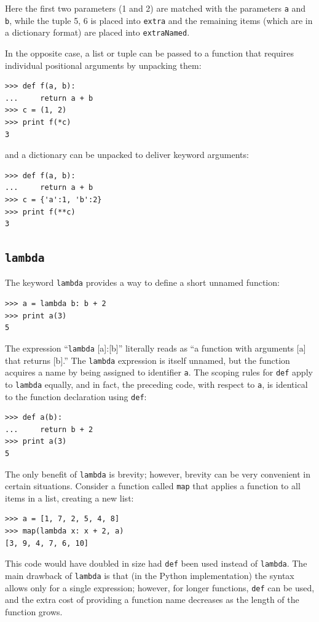 \documentclass[justified,sixbynine]{tufte-book}
\def\ft{\small\tt}
\theoremstyle{plain}%
\theoremstyle{definition}
\theoremstyle{remark}
\begin{document}
\begin{fullwidth}
Here the first two parameters (1 and 2) are matched with the parameters {\ft a} and {\ft b}, while the tuple 5, 6 is placed into {\ft extra} and the remaining items (which are in a dictionary format) are placed into {\ft extraNamed}.

In the opposite case, a list or tuple can be passed to a function that requires individual positional arguments by unpacking them:

\begin{lstlisting}
>>> def f(a, b):
...     return a + b
>>> c = (1, 2)
>>> print f(*c)
3
\end{lstlisting}
\noindent and a dictionary can be unpacked to deliver keyword arguments:

\begin{lstlisting}
>>> def f(a, b):
...     return a + b
>>> c = {'a':1, 'b':2}
>>> print f(**c)
3
\end{lstlisting}

\goodbreak\subsection{{\ft lambda}}


The keyword {\ft lambda} provides a way to define a short unnamed function:
\begin{lstlisting}
>>> a = lambda b: b + 2
>>> print a(3)
5
\end{lstlisting}

The expression ``{\ft lambda} [a]:[b]'' literally reads as ``a function with arguments [a] that returns [b].'' The {\ft lambda} expression is itself unnamed, but the function acquires a name by being assigned to identifier {\ft a}.  The scoping rules for {\ft def} apply to {\ft lambda} equally, and in fact, the preceding code, with respect to {\ft a}, is identical to the function declaration using {\ft def}:

\begin{lstlisting}
>>> def a(b):
...     return b + 2
>>> print a(3)
5
\end{lstlisting}

The only benefit of {\ft lambda} is brevity; however, brevity can be very convenient in certain situations.  Consider a function called {\ft map} that applies a function to all items in a list, creating a new list:

\begin{lstlisting}
>>> a = [1, 7, 2, 5, 4, 8]
>>> map(lambda x: x + 2, a)
[3, 9, 4, 7, 6, 10]
\end{lstlisting}
This code would have doubled in size had {\ft def} been used instead of {\ft lambda}. The main drawback of {\ft lambda} is that (in the Python implementation) the syntax allows only for a single expression; however, for longer functions, {\ft def} can be used, and the extra cost of providing a function name decreases as the length of the function grows.


\end{fullwidth}
\end{document}
